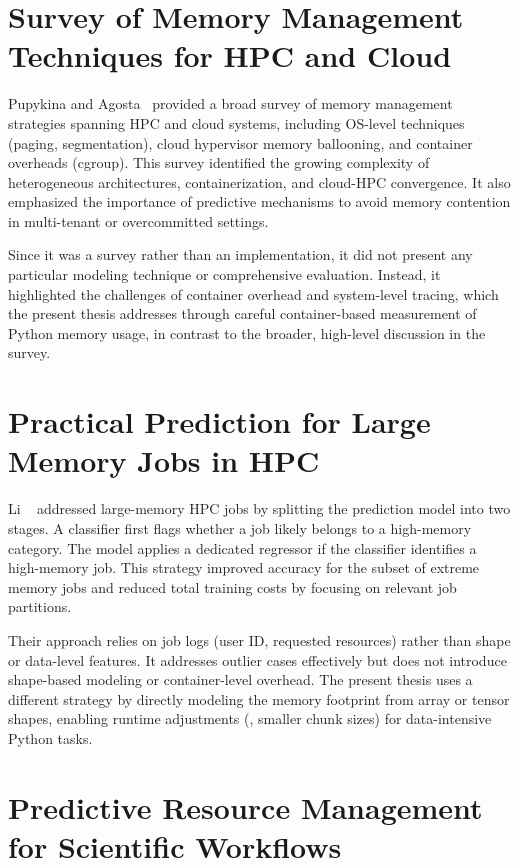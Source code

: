 \section{Survey of Memory Management Techniques for HPC and Cloud}
\label{sec:rw-survey-hpc-cloud}

Pupykina and Agosta~\cite{pupykina2019} provided a broad survey of memory management strategies spanning \ac{HPC} and cloud systems, including \ac{OS}-level techniques (paging, segmentation), cloud hypervisor memory ballooning, and container overheads (\ac{cgroup}).
This survey identified the growing complexity of heterogeneous architectures, containerization, and cloud-\ac{HPC} convergence.
It also emphasized the importance of predictive mechanisms to avoid memory contention in multi-tenant or overcommitted settings.

Since it was a survey rather than an implementation, it did not present any particular modeling technique or comprehensive evaluation.
Instead, it highlighted the challenges of container overhead and system-level tracing, which the present thesis addresses through careful container-based measurement of Python memory usage, in contrast to the broader, high-level discussion in the survey.


\section{Practical Prediction for Large Memory Jobs in HPC}
\label{sec:rw-practical-prediction}

Li \etal~\cite{li2019} addressed large-memory \ac{HPC} jobs by splitting the prediction model into two stages.
A classifier first flags whether a job likely belongs to a high-memory category.
The model applies a dedicated regressor if the classifier identifies a high-memory job.
This strategy improved accuracy for the subset of extreme memory jobs and reduced total training costs by focusing on relevant job partitions.

Their approach relies on job logs (user ID, requested resources) rather than shape or data-level features.
It addresses outlier cases effectively but does not introduce shape-based modeling or container-level overhead.
The present thesis uses a different strategy by directly modeling the memory footprint from array or tensor shapes, enabling runtime adjustments (\eg, smaller chunk sizes) for data-intensive Python tasks.


\section{Predictive Resource Management for Scientific Workflows}
\label{sec:rw-predictive-resource-management}

